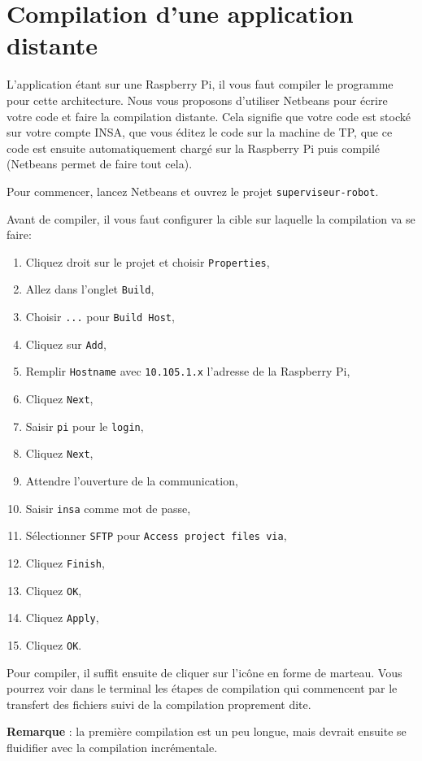\documentclass[11pt]{paper}
\newcommand{\raspi}{Raspberry Pi\xspace}
\begin{document}
\section{Compilation d'une application distante}

L'application étant sur une \raspi, il vous faut compiler le programme pour cette architecture. Nous vous proposons d'utiliser Netbeans pour écrire votre code et faire la compilation distante. Cela signifie que votre code est stocké sur votre compte INSA, que vous éditez le code sur la machine de TP, que ce code est ensuite automatiquement chargé sur la \raspi puis compilé (Netbeans permet de faire tout cela).

Pour commencer, lancez Netbeans et ouvrez le projet {\tt superviseur-robot}.

Avant de compiler, il vous faut configurer la cible sur laquelle la compilation va se faire:
\begin{enumerate}
\item Cliquez droit sur le projet et choisir {\tt Properties},
\item Allez dans l'onglet {\tt Build},
\item Choisir {\tt ...} pour {\tt Build Host},
\item Cliquez sur {\tt Add},
\item Remplir {\tt Hostname} avec {\tt 10.105.1.x} l'adresse de la \raspi,
\item Cliquez {\tt Next},
\item Saisir {\tt pi} pour le {\tt login},
\item Cliquez {\tt Next},
\item Attendre l'ouverture de la communication,
\item Saisir {\tt insa} comme mot de passe,
\item Sélectionner {\tt  SFTP} pour {\tt Access project files via},
\item Cliquez {\tt Finish},
\item Cliquez {\tt OK},
\item Cliquez {\tt Apply},
\item Cliquez {\tt OK}.
\end{enumerate}

Pour compiler, il suffit ensuite de cliquer sur l'icône en forme de marteau. Vous pourrez voir dans le terminal les étapes de compilation qui commencent par le transfert des fichiers suivi de la compilation proprement dite.

{\bf Remarque} : la première compilation est un peu longue, mais devrait ensuite se fluidifier avec la compilation incrémentale.
\end{document}
